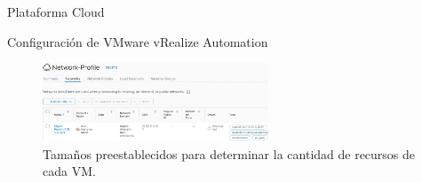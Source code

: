 \begin{subsection}{Plataforma Cloud}
\begin{subsubsection}{Configuración de VMware vRealize Automation}
        \begin{figure}[h]
            \centering
            \includegraphics[width=0.6\textwidth]{imaxes/pruebaconcepto/vrealize/falvor-mapping.png}
            \caption{Tamaños preestablecidos para determinar la cantidad de recursos de cada VM.}
            \label{fig:falvor-mapping}
        \end{figure}
        \FloatBarrier

    \end{subsubsection}


\end{subsection}
